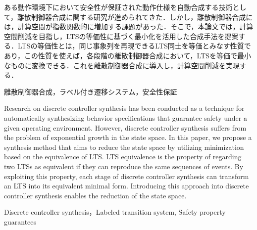 \documentclass[technicalreport]{ieicej}
\begin{document}
\begin{jabstract}
ある動作環境下において安全性が保証された動作仕様を自動合成する技術として，離散制御器合成に関する研究が進められてきた．しかし，離散制御器合成には，計算空間が指数関数的に増加する課題があった．そこで，本論文では，計算空間削減を目指し，LTSの等価性に基づく最小化を活用した合成手法を提案する．LTSの等価性とは，同じ事象列を再現できるLTS同士を等価とみなす性質であり，この性質を使えば，各段階の離散制御器合成において，LTSを等価で最小なものに変換できる．これを離散制御器合成に導入し，計算空間削減を実現する．
\end{jabstract}
\begin{jkeyword}
離散制御器合成，ラベル付き遷移システム，安全性保証
\end{jkeyword}
\begin{eabstract}
Research on discrete controller synthesis has been conducted as a technique for automatically synthesizing behavior specifications that guarantee safety under a given operating environment. However, discrete controller synthesis suffers from the problem of exponential growth in the state space. In this paper, we propose a synthesis method that aims to reduce the state space by utilizing minimization based on the equivalence of LTS. LTS equivalence is the property of regarding two LTSs as equivalent if they can reproduce the same sequences of events. By exploiting this property, each stage of discrete controller synthesis can transform an LTS into its equivalent minimal form. Introducing this approach into discrete controller synthesis enables the reduction of the state space.
\end{eabstract}
\begin{ekeyword}
Discrete controller synthesis，Labeled transition system, Safety property guarantees
\end{ekeyword}
\maketitle
\end{document}

